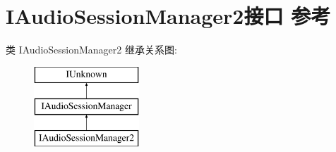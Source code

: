 \hypertarget{interface_i_audio_session_manager2}{}\section{I\+Audio\+Session\+Manager2接口 参考}
\label{interface_i_audio_session_manager2}
类 I\+Audio\+Session\+Manager2 继承关系图\+:\begin{figure}[H]
\begin{center}
\leavevmode
\includegraphics[height=3.000000cm]{interface_i_audio_session_manager2}
\end{center}
\end{figure}
